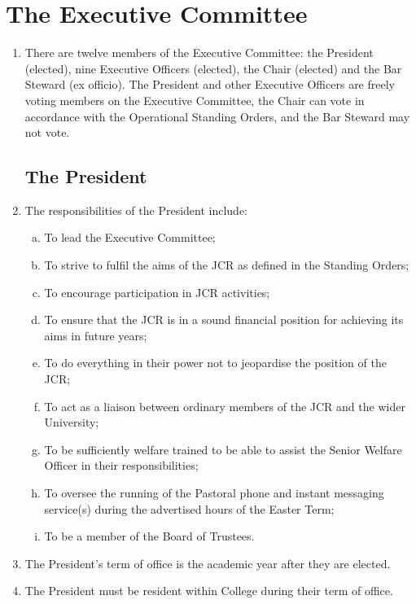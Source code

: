 \documentclass[12pt]{article}
\begin{document}
\section{The Executive Committee}
\begin{enumerate}
    \item There are twelve members of the Executive Committee: the President (elected), nine Executive Officers (elected), the Chair (elected) and the Bar Steward (ex officio).
    The President and other Executive Officers are freely voting members on the Executive Committee, the Chair can vote in accordance with the Operational Standing Orders, and the Bar Steward may not vote.
    \subsection{The President}
    \item The responsibilities of the President include:
    \begin{enumerate}[(a)]
        \item To lead the Executive Committee;
        \item To strive to fulfil the aims of the JCR as defined in the Standing Orders;
        \item To encourage participation in JCR activities;
        \item To ensure that the JCR is in a sound financial position for achieving its aims in future years;
        \item To do everything in their power not to jeopardise the position of the JCR;
        \item To act as a liaison between ordinary members of the JCR and the wider University;
        \item To be sufficiently welfare trained to be able to assist the Senior Welfare Officer in their responsibilities;
        \item To oversee the running of the Pastoral phone and instant messaging service(s) during the advertised hours of the Easter Term;
        \item To be a member of the Board of Trustees.
    \end{enumerate}
    \item The President's term of office is the academic year after they are elected.
    \item The President must be resident within College during their term of office.

\end{enumerate}
\end{document}
